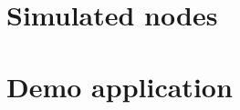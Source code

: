 \section{Simulated nodes}
\label{sec:porting_nodes}

\section{Demo application}
\label{sec:porting_demo}

%
%
%
%
%

